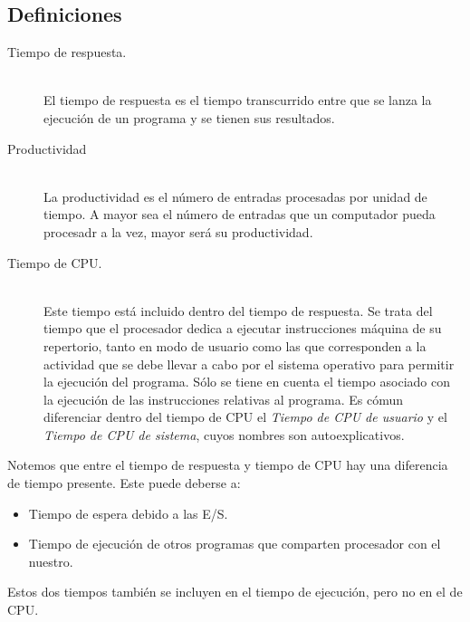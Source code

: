 \subsection{Definiciones}
\begin{description}
    \item [Tiempo de respuesta.]~\\
        El tiempo de respuesta es el tiempo transcurrido entre que se lanza la ejecución de un programa y se tienen sus resultados.
    \item [Productividad]~\\
        La productividad es el número de entradas procesadas por unidad de tiempo. A mayor sea el número de entradas que un computador pueda procesadr a la vez, mayor será su productividad.
    \item [Tiempo de CPU.]~\\
        Este tiempo está incluido dentro del tiempo de respuesta. Se trata del tiempo que el procesador dedica a ejecutar instrucciones máquina de su repertorio, tanto en modo de usuario como las que corresponden a la actividad que se debe llevar a cabo por el sistema operativo para permitir la ejecución del programa. Sólo se tiene en cuenta el tiempo asociado con la ejecución de las instrucciones relativas al programa. Es cómun diferenciar dentro del tiempo de CPU el \emph{Tiempo de CPU de usuario} y el \emph{Tiempo de CPU de sistema}, cuyos nombres son autoexplicativos.
\end{description}
Notemos que entre el tiempo de respuesta y tiempo de CPU hay una diferencia de tiempo presente. Este puede deberse a:
\begin{itemize}
    \item Tiempo de espera debido a las E/S.
    \item Tiempo de ejecución de otros programas que comparten procesador con el nuestro.
\end{itemize}
Estos dos tiempos también se incluyen en el tiempo de ejecución, pero no en el de CPU.

